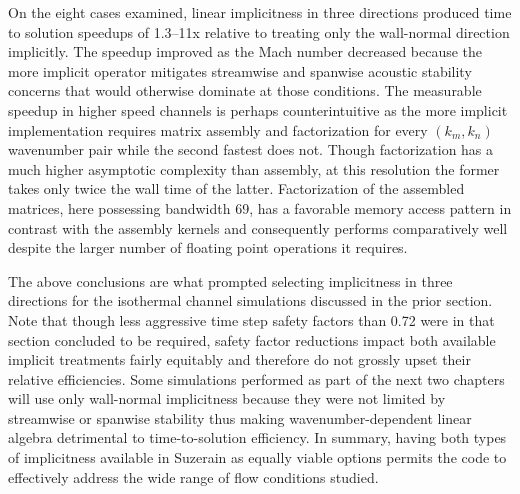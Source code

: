 On the eight cases examined, linear implicitness in three directions produced
time to solution speedups of 1.3--11x relative to treating only the wall-normal
direction implicitly.  The speedup improved as the Mach number decreased because
the more implicit operator mitigates streamwise and spanwise acoustic stability
concerns that would otherwise dominate at those conditions.  The measurable
speedup in higher speed channels is perhaps counterintuitive as the more
implicit
implementation requires matrix assembly and factorization for every $(k_m, k_n)$
wavenumber pair while the second fastest does not.  Though factorization has a
much higher asymptotic complexity than assembly, at this resolution the former
takes only twice the wall time of the latter.  Factorization of the assembled
matrices, here possessing bandwidth 69, has a favorable memory access pattern in
contrast with the assembly kernels and consequently performs comparatively well
despite the larger number of floating point operations it requires.
%

The above conclusions are what prompted selecting implicitness in three
directions for the isothermal channel simulations discussed in the prior
section.  Note that though less aggressive time step safety factors than 0.72
were in that section concluded to be required, safety factor reductions impact both
available implicit treatments fairly equitably and therefore do not grossly
upset their relative efficiencies.  Some simulations performed as part of the
next two chapters will use only wall-normal implicitness because they were not
limited by streamwise or spanwise stability thus making wavenumber-dependent
linear algebra detrimental to time-to-solution efficiency.  In summary, having both
types of implicitness available in Suzerain as equally viable options permits
the code to effectively address the wide range of flow conditions studied.

